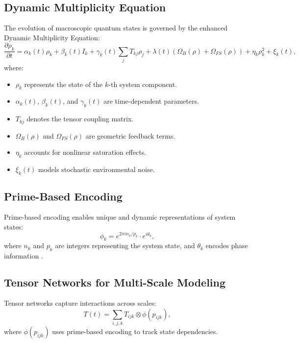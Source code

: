 \documentclass{article}
\theoremstyle{plain}
\begin{document}
\subsection{Dynamic Multiplicity Equation}
The evolution of macroscopic quantum states is governed by the enhanced Dynamic Multiplicity Equation:
\begin{equation}
\frac{\partial \rho_k}{\partial t} = \alpha_k(t) \rho_k + \beta_k(t) I_k + \gamma_k(t) \sum_j T_{kj} \rho_j + \lambda(t)(\Omega_B(\rho) + \Omega_{FS}(\rho)) + \eta_k \rho_k^2 + \xi_k(t),
\label{eq:dynamic_eq}
\end{equation}
where:
\begin{itemize}
    \item $\rho_k$ represents the state of the $k$-th system component.
    \item $\alpha_k(t)$, $\beta_k(t)$, and $\gamma_k(t)$ are time-dependent parameters.
    \item $T_{kj}$ denotes the tensor coupling matrix.
    \item $\Omega_B(\rho)$ and $\Omega_{FS}(\rho)$ are geometric feedback terms.
    \item $\eta_k$ accounts for nonlinear saturation effects.
    \item $\xi_k(t)$ models stochastic environmental noise.
\end{itemize}

\subsection{Prime-Based Encoding}
Prime-based encoding enables unique and dynamic representations of system states:\newline
\begin{equation}
\phi_k = e^{2\pi i n_k/p_k} \cdot e^{i\theta_k},
\end{equation}
where $n_k$ and $p_k$ are integers representing the system state, and $\theta_k$ encodes phase information \cite{van2024prime}.

\subsection{Tensor Networks for Multi-Scale Modeling}
Tensor networks capture interactions across scales:
\begin{equation}
T(t) = \sum_{i,j,k} T_{ijk} \otimes \phi(p_{ijk}),
\end{equation}
where $\phi(p_{ijk})$ uses prime-based encoding to track state dependencies.
\end{document}
